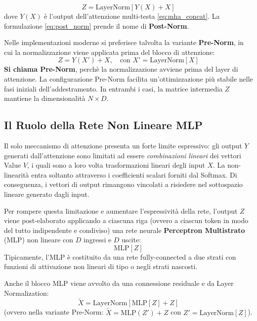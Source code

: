 \begin{equation}
Z = \text{LayerNorm}\left[ Y(X) + X \right] \label{eq:post_norm}
\end{equation}
dove $Y(X)$ è l'output dell'attenzione multi-testa \eqref{eq:mha_concat}. La formulazione \eqref{eq:post_norm} prende il nome di \textbf{Post-Norm}.

Nelle implementazioni moderne si preferisce talvolta la variante \textbf{Pre-Norm}, in cui la normalizzazione viene applicata prima del blocco di attenzione:
\begin{equation}
Z = Y(X') + X, \quad \text{con } X' = \text{LayerNorm}[X] \label{eq:pre_norm}
\end{equation}
\textbf{Si chiama Pre-Norm}, perchè la normalizzazione avviene prima del layer di attenzione.
La configurazione Pre-Norm facilita un'ottimizzazione più stabile nelle fasi iniziali dell'addestramento. In entrambi i casi, la matrice intermedia $Z$ mantiene la dimensionalità $N \times D$.

\subsection{Il Ruolo della Rete Non Lineare MLP}
Il solo meccanismo di attenzione presenta un forte limite espressivo: gli output $Y$ generati dall'attenzione sono limitati ad essere \emph{combinazioni lineari} dei vettori Value $V$, i quali sono a loro volta trasformazioni lineari degli input $X$. La non-linearità entra soltanto attraverso i coefficienti scalari forniti dal Softmax. Di conseguenza, i vettori di output rimangono vincolati a risiedere nel sottospazio lineare generato dagli input.

Per rompere questa limitazione e aumentare l'espressività della rete, l'output $Z$ viene post-elaborato applicando a ciascuna riga (ovvero a ciascun token in modo del tutto indipendente e condiviso) una rete neurale \textbf{Perceptron Multistrato} (MLP) non lineare con $D$ ingressi e $D$ uscite:
\begin{equation}
\text{MLP}[Z]
\end{equation}
Tipicamente, l'MLP è costituito da una rete fully-connected a due strati con funzioni di attivazione non lineari di tipo  o  negli strati nascosti.

Anche il blocco MLP viene avvolto da una connessione residuale e da Layer Normalization:
\begin{equation}
\tilde{X} = \text{LayerNorm}\left[ \text{MLP}[Z] + Z \right] \label{eq:transformer_layer_final}
\end{equation}
(ovvero nella variante Pre-Norm: $\tilde{X} = \text{MLP}(Z') + Z$ con $Z' = \text{LayerNorm}[Z]$).

